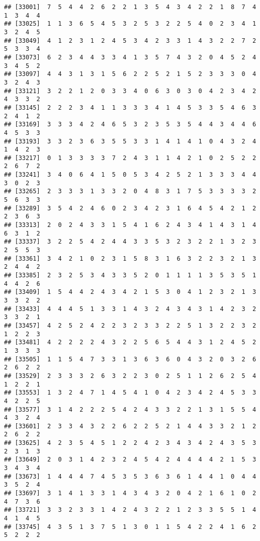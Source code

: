 \documentclass[
]{article}
\begin{document}
\begin{verbatim}
## [33001]  7  5  4  4  2  6  2  2  1  3  5  4  3  4  2  2  1  8  7  4  1  3  4  4
## [33025]  1  1  3  6  5  4  5  3  2  5  3  2  2  5  4  0  2  3  4  1  3  2  4  5
## [33049]  4  1  2  3  1  2  4  5  3  4  2  3  3  1  4  3  2  2  7  2  5  3  3  4
## [33073]  6  2  3  4  4  3  3  4  1  3  5  7  4  3  2  0  4  5  2  4  3  4  5  2
## [33097]  4  4  3  1  3  1  5  6  2  2  5  2  1  5  2  3  3  3  0  4  3  2  4  3
## [33121]  3  2  2  1  2  0  3  3  4  0  6  3  0  3  0  4  2  3  4  2  4  3  3  2
## [33145]  2  2  2  3  4  1  1  3  3  3  4  1  4  5  3  3  5  4  6  3  2  4  1  2
## [33169]  3  3  3  4  2  4  6  5  3  2  3  5  3  5  4  4  3  4  4  6  4  5  3  3
## [33193]  3  3  2  3  6  3  5  5  3  3  1  4  1  4  1  0  4  3  2  4  1  4  2  3
## [33217]  0  1  3  3  3  3  7  2  4  3  1  1  4  2  1  0  2  5  2  2  2  6  7  2
## [33241]  3  4  0  6  4  1  5  0  5  3  4  2  5  2  1  3  3  3  4  4  3  0  2  3
## [33265]  2  3  3  3  1  3  3  2  0  4  8  3  1  7  5  3  3  3  3  2  5  6  3  3
## [33289]  3  5  4  2  4  6  0  2  3  4  2  3  1  6  4  5  4  2  1  2  2  3  6  3
## [33313]  2  0  2  4  3  3  1  5  4  1  6  2  4  3  4  1  4  3  1  4  6  3  1  2
## [33337]  3  2  2  5  4  2  4  4  3  3  5  3  2  3  2  2  1  3  2  3  2  5  5  3
## [33361]  3  4  2  1  0  2  3  1  5  8  3  1  6  3  2  2  3  2  1  3  2  4  4  2
## [33385]  2  3  2  5  3  4  3  3  5  2  0  1  1  1  1  3  5  3  5  1  4  4  2  6
## [33409]  1  5  4  4  2  4  3  4  2  1  5  3  0  4  1  2  3  2  1  3  3  3  2  2
## [33433]  4  4  4  5  1  3  3  1  4  3  2  4  3  4  3  1  4  2  3  2  3  3  2  1
## [33457]  4  2  5  2  4  2  2  3  2  3  3  2  2  5  1  3  2  2  3  2  1  2  2  3
## [33481]  4  2  2  2  2  4  3  2  2  5  6  5  4  4  3  1  2  4  5  2  1  3  3  3
## [33505]  1  1  5  4  7  3  3  1  3  6  3  6  0  4  3  2  0  3  2  6  2  6  2  2
## [33529]  2  3  3  3  2  6  3  2  2  3  0  2  5  1  1  2  6  2  5  4  1  2  2  1
## [33553]  1  3  2  4  7  1  4  5  4  1  0  4  2  3  4  2  4  5  3  3  4  2  2  5
## [33577]  3  1  4  2  2  2  5  4  2  4  3  3  2  2  1  3  1  5  5  4  4  3  2  4
## [33601]  2  3  3  4  3  2  2  6  2  2  5  2  1  4  4  3  3  2  1  2  2  6  2  2
## [33625]  4  2  3  5  4  5  1  2  2  4  2  3  4  3  4  2  4  3  5  3  2  3  1  3
## [33649]  2  0  3  1  4  2  3  2  4  5  4  2  4  4  4  4  2  1  5  3  3  4  3  4
## [33673]  1  4  4  4  7  4  5  3  5  3  6  3  6  1  4  4  1  0  4  4  3  5  2  4
## [33697]  3  1  4  1  3  3  1  4  3  4  3  2  0  4  2  1  6  1  0  2  4  7  3  6
## [33721]  3  3  2  3  3  1  4  2  4  3  2  2  1  2  3  3  5  5  1  4  4  1  4  5
## [33745]  4  3  5  1  3  7  5  1  3  0  1  1  5  4  2  2  4  1  6  2  5  2  2  2

\end{verbatim}
\end{document}
